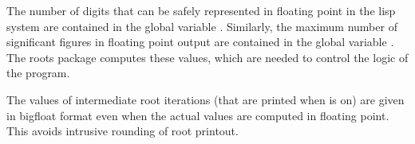 The number of digits that can be safely represented in floating point in
the lisp system are contained in the global variable .
Similarly, the maximum number of significant figures in floating point
output are contained in the global variable .  The roots
package computes these values, which are needed to control the logic of
the program.  

The values of intermediate root iterations (that are printed when 
is on) are given in bigfloat format even when the actual values
are computed in floating point.  This avoids intrusive rounding of root
printout.
